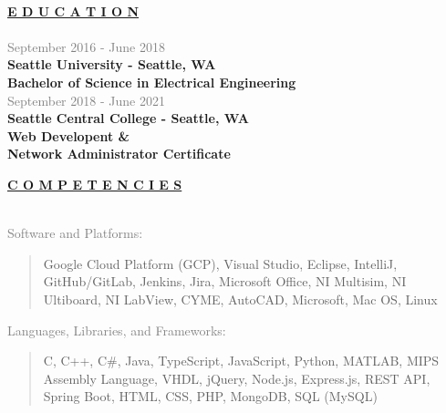 \documentclass[letterpage]{article}
\begin{document}
\vspace*{20px}\\ %
\begin{minipage}[t]{0.424\linewidth}
\vspace{0pt}

\textbf{\fontsize{14px}{1px}\selectfont
  \ul{E D U C A T I O N}
}\\
\vspace{5px}\\
\textcolor{gray}{September 2016 - June 2018}\\
\textbf{\textsf{Seattle University - Seattle, WA}}\\
\textbf{Bachelor of Science in Electrical Engineering}\\

\textcolor{gray}{September 2018 - June 2021}\\
\textbf{\textsf{Seattle Central College - Seattle, WA}}\\
\textbf{Web Developent \& }\\
\textbf{Network Administrator Certificate}\\
\vspace{19px}

\textbf{\fontsize{14px}{1px}\selectfont
  \ul{C O M P E T E N C I E S}
}\\
\vspace{0px}\\
\begin{minipage}[t]{0.01\linewidth}
  \end{minipage}
  \: %

  \vspace{7px}
  \textcolor{gray}{Software and Platforms:}\\
  \begin{quote}
      \textmd{Google Cloud Platform (GCP), Visual Studio, Eclipse, IntelliJ, GitHub/GitLab, Jenkins, Jira, Microsoft Office, NI
      Multisim, NI Ultiboard, NI LabView, CYME, AutoCAD, Microsoft, Mac OS,
      Linux}\\
  \end{quote}

  \vspace{7px}
  \textcolor{gray}{Languages, Libraries, and Frameworks:} \\ 
  \begin{quote}
    \textmd{C, C++, C\#, Java, TypeScript, JavaScript, Python, MATLAB, MIPS Assembly
    Language, VHDL, jQuery, Node.js, Express.js, REST API, Spring Boot, HTML, CSS, PHP,
    MongoDB, SQL (MySQL)}\\
  \end{quote}


\end{minipage}
\end{document}
